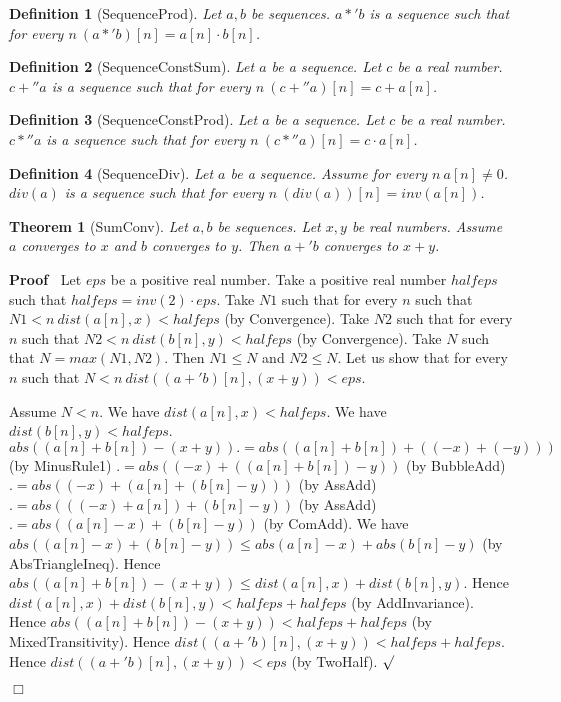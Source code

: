 \documentclass{article}
\newenvironment{forthel}{\begin{leftbar}}{\end{leftbar}}
\newenvironment{proof}{\noindent\textbf{Proof\ }}{\hspace*{\fill}$\Box$\medskip}
\newenvironment{subproof}{\begin{list}{}{}
		\item[\text{Proof}]}{\hfill $\surd$ \end{list}}
\newtheorem{theorem}{Theorem}
\newtheorem{definition}{Definition}
\begin{document}
\begin{forthel}
	\begin{definition}[SequenceProd]
	Let $a,b$ be sequences. $a *' b$ is a sequence such that for every $n \ (a *' b)[n] = a[n] \cdot b[n]$.
	\end{definition}
	
	\begin{definition}[SequenceConstSum]
	Let $a$ be a sequence. Let $c$ be a real number. $c +'' a$ is a sequence such that for every $n \ (c +'' a)[n] = c + a[n]$.
	\end{definition}
	
	\begin{definition}[SequenceConstProd]
	Let $a$ be a sequence. Let $c$ be a real number. $c *'' a$ is a sequence such that for every $n \ (c *'' a)[n] = c \cdot a[n]$.
	\end{definition}

	\begin{definition}[SequenceDiv]
	Let $a$ be a sequence. Assume for every $n \ a[n] \neq 0$. $div(a)$ is a sequence such that for every $n \ (div(a))[n] = inv(a[n])$.
	\end{definition}
	
	\begin{theorem}[SumConv]
	Let $a,b$ be sequences. Let $x,y$ be real numbers. Assume $a$ converges to $x$ and $b$ converges to $y$.
	Then $a +' b$ converges to $x + y$.
	\end{theorem}
	\begin{proof}
	Let $eps$ be a positive real number.
	Take a positive real number $halfeps$ such that $halfeps = inv(2) \cdot eps$.
	Take $N1$ such that for every $n$ such that $N1 < n \ dist(a[n],x) < halfeps$ (by Convergence).
	Take $N2$ such that for every $n$ such that $N2 < n \ dist(b[n],y) < halfeps$ (by Convergence).
	Take $N$ such that $N = max(N1,N2)$.
	Then $N1 \leq N$ and $N2 \leq N$.
	Let us show that for every $n$ such that $N < n \ dist((a +' b)[n],(x+y)) < eps$.
	\begin{subproof}
	Assume $N < n$.
	We have $dist(a[n],x) < halfeps$.
	We have $dist(b[n],y) < halfeps$.
	$abs((a[n] + b[n]) - (x + y)) .= abs((a[n] + b[n]) + ((-x) + (-y)))$ (by MinusRule1)
	$.= abs((-x) + ((a[n] + b[n]) - y))$ (by BubbleAdd)
	$.= abs((-x) + (a[n] + (b[n] - y)))$ (by AssAdd)
	$.= abs(((-x) + a[n]) + (b[n] - y))$ (by AssAdd)
	$.= abs((a[n] - x) + (b[n] - y))$ (by ComAdd).
	We have $abs((a[n] - x) + (b[n] - y)) \leq abs(a[n] - x) + abs(b[n] - y)$  (by AbsTriangleIneq).
	Hence $abs((a[n] + b[n]) - (x + y)) \leq dist(a[n],x) + dist(b[n],y)$.
	Hence $dist(a[n],x) + dist(b[n],y) < halfeps + halfeps$ (by AddInvariance).
	Hence $abs((a[n] + b[n]) - (x + y)) < halfeps + halfeps$ (by MixedTransitivity).
	Hence $dist((a +' b)[n],(x + y)) < halfeps + halfeps$.
	Hence $dist((a +' b)[n],(x + y)) < eps$ (by TwoHalf).
	\end{subproof}
	\end{proof}
	

\end{forthel}
\end{document}
